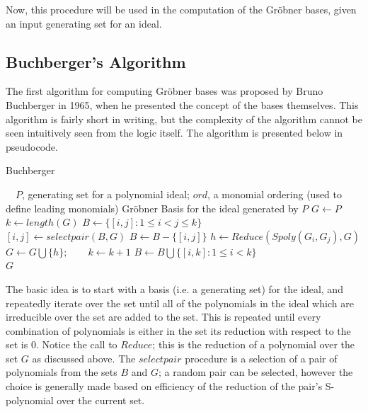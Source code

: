 \documentclass[letterpaper,12pt,titlepage,oneside,final]{book}
\begin{document}
Now, this procedure will be used in the computation of the Gr\"obner bases, given an input generating set for an ideal. 

\subsection{Buchberger's Algorithm}

The first algorithm for computing Gr\"obner bases was proposed by Bruno Buchberger in 1965, when he presented the concept of the bases themselves.  This algorithm is fairly short in writing, but the complexity of the algorithm cannot be seen intuitively seen from the logic itself.  The algorithm is presented below in pseudocode.

\begin{algorithm}[H]
\caption{Buchberger}\label{buchberger}
\begin{algorithmic}[1]
\Input $\quad P$, generating set for a polynomial ideal; $ord$, a monomial ordering (used to define leading monomials)
\Output Gr\"obner Basis for the ideal generated by $P$
\State $G \gets P$
\State $k \gets length( G)$
\State $B \gets \{[i, j] : 1 \leq i < j \leq k\}$\\
  \State $[i, j] \gets selectpair( B, G)$
  \State $B \gets B - \{[i, j]\}$
  \State $h \gets Reduce( Spoly( G_i, G_j), G)$
    \State $G \gets G \bigcup \{h\}; \qquad k \gets k + 1$
    \State $B \gets B \bigcup \{[i, k] : 1 \leq i < k\}$
  \EndIf
\EndWhile\\
\Return $G$
\EndProcedure
\end{algorithmic}
\end{algorithm}  

The basic idea is to start with a basis (i.e. a generating set) for the ideal, and repeatedly iterate over the set until all of the polynomials in the ideal which are irreducible over the set are added to the set.  This is repeated until every combination of polynomials is either in the set its reduction with respect to the set is 0.  Notice the call to ${Reduce}$; this is the reduction of a polynomial over the set ${G}$ as discussed above.  The ${selectpair}$ procedure is a selection of a pair of polynomials from the sets ${B}$ and ${G}$; a random pair can be selected, however the choice is generally made based on efficiency of the reduction of the pair's S-polynomial over the current set.     
\end{document}
